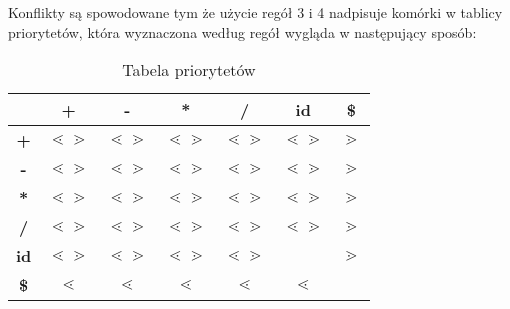 \documentclass{article}
\begin{document}
    Konflikty są spowodowane tym że użycie regół 3 i 4 nadpisuje komórki w tablicy priorytetów, która wyznaczona według regół wygląda w następujący sposób:

	\begin{table}[h!]
		\begin{center}
			\caption{Tabela priorytetów}
			\label{tab:table1}
			\begin{tabular}{c||c|c|c|c|c|c}
				& \textbf{+} & \textbf{-} & \textbf{*} & \textbf{/} & \textbf{id} & \textbf{\$}\\
                \hline
                \hline
                \textbf{+} & $\lessdot \gtrdot$ & $\lessdot \gtrdot$ & $\lessdot \gtrdot$ & $\lessdot \gtrdot$ & $\lessdot \gtrdot$ & $\gtrdot$ \\
                \hline
                \textbf{-} & $\lessdot \gtrdot$ & $\lessdot \gtrdot$ & $\lessdot \gtrdot$ & $\lessdot \gtrdot$ & $\lessdot \gtrdot$ & $\gtrdot$ \\
                \hline
                \textbf{*} & $\lessdot \gtrdot$ & $\lessdot \gtrdot$ & $\lessdot \gtrdot$ & $\lessdot \gtrdot$ & $\lessdot \gtrdot$ & $\gtrdot$ \\
                \hline
                \textbf{/} & $\lessdot \gtrdot$ & $\lessdot \gtrdot$ & $\lessdot \gtrdot$ & $\lessdot \gtrdot$ & $\lessdot \gtrdot$ & $\gtrdot$ \\
                \hline
                \textbf{id} & $\lessdot \gtrdot$ & $\lessdot \gtrdot$ & $\lessdot \gtrdot$ & $\lessdot \gtrdot$ &  & $\gtrdot$ \\
                \hline
                \textbf{\$} & $\lessdot$ & $\lessdot$ & $\lessdot$ & $\lessdot$ & $\lessdot$ &  \\				
			\end{tabular}
		\end{center}
	\end{table}
\end{document}

